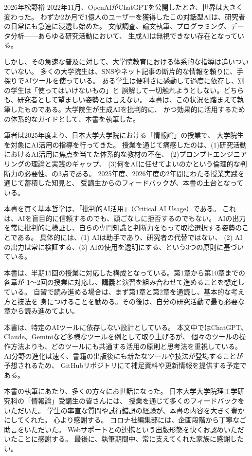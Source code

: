\begin{preface}{2026年}{松野裕}
2022年11月、OpenAIがChatGPTを公開したとき、世界は大きく変わった。
わずか2か月で1億人のユーザーを獲得したこの対話型AIは、研究者の日常にも急速に浸透し始めた。
文献調査、論文執筆、プログラミング、データ分析——あらゆる研究活動において、
生成AIは無視できない存在となっている。

しかし、その急速な普及に対して、大学院教育における体系的な指導は追いついていない。
多くの大学院生は、SNSやネット記事の断片的な情報を頼りに、手探りでAIツールを使っている。
ある学生は便利さに感動して過度に依存し、別の学生は「使ってはいけないもの」と
誤解して一切触れようとしない。どちらも、研究者として望ましい姿勢とは言えない。
本書は、この状況を踏まえて執筆したものである。大学院生が生成AIを批判的に、
かつ効果的に活用するための体系的なガイドとして、本書を執筆した。

筆者は2025年度より、日本大学大学院における「情報論」の授業で、
大学院生を対象にAI活用の指導を行ってきた。
授業を通じて痛感したのは、(1)研究活動におけるAI活用に焦点を当てた体系的な教材の不在、
(2)プロンプトエンジニアリングの理論と実践のギャップ、
(3)何をAIに任せてよいのかという倫理的な判断力の必要性、の3点である。
2025年度、2026年度の2年間にわたる授業実践を通じて蓄積した知見と、
受講生からのフィードバックが、本書の土台となっている。

本書を貫く基本哲学は、「批判的AI活用」（Critical AI Usage）である。
これは、AIを盲目的に信頼するのでも、頭ごなしに拒否するのでもない。
AIの出力を常に批判的に検証し、自らの専門知識と判断力をもって取捨選択する姿勢のことである。
具体的には、(1) AIは助手であり、研究者の代替ではない、
(2) AIの出力は常に検証する、(3) AIの使用を透明にする、という3つの原則に基づいている。

本書は、半期15回の授業に対応した構成となっている。第1章から第10章までの各章が
1〜2回の授業に対応し、講義と演習を組み合わせて進めることを想定している。
自習で読み進める場合は、まず第1章と第2章を通読し、基本的な考え方と技法を
身につけることを勧める。その後は、自分の研究活動で最も必要な章から読み進めてよい。

本書は、特定のAIツールに依存しない設計としている。
本文中ではChatGPT、Claude、Geminiなど多様なツールを例として取り上げるが、
個々のツールの操作方法よりも、どのツールにも共通する活用の原則と思考法を重視している。
AI分野の進化は速く、書籍の出版後にも新たなツールや技法が登場することが予想されるため、
GitHubリポジトリにて補足資料や更新情報を提供する予定である。

本書の執筆にあたり、多くの方々にお世話になった。
日本大学大学院理工学研究科の「情報論」受講生の皆さんには、
授業を通じて多くのフィードバックをいただいた。
学生の率直な質問や試行錯誤の経験が、本書の内容を大きく豊かにしてくれた。
心より感謝する。
コロナ社編集部には、企画段階から丁寧なご助言をいただいた。
Webサポートとの連携という出版形態を快くお認めいただいたことに感謝する。
最後に、執筆期間中、常に支えてくれた家族に感謝したい。
\end{preface}
